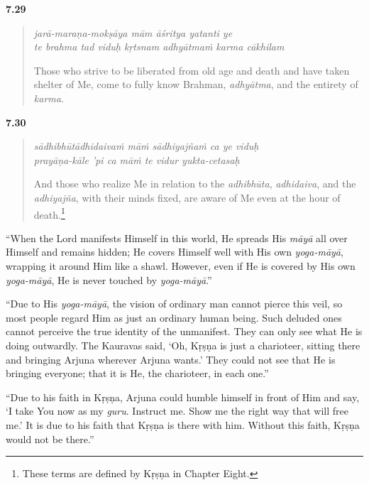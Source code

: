 \par\noindent\textbf{7.29}\par
\begin{verse}
\textit{jarā-maraṇa-mokṣāya mām āśritya yatanti ye} \\
\textit{te brahma tad viduḥ kṛtsnam adhyātmaṁ karma cākhilam}

\noindent Those who strive to be liberated from old age and death and have taken shelter of Me, come to fully know Brahman, \textit{adhyātma}, and the entirety of \textit{karma}.
\end{verse}
\par



\par\noindent\textbf{7.30}\par
\begin{verse}
\textit{sādhibhūtādhidaivaṁ māṁ sādhiyajñaṁ ca ye viduḥ} \\
\textit{prayāṇa-kāle ’pi ca māṁ te vidur yukta-cetasaḥ}

\noindent And those who realize Me in relation to the \textit{adhibhūta}, \textit{adhidaiva}, and the \textit{adhiyajña}, with their minds fixed, are aware of Me even at the hour of death.\footnote{These terms are defined by Kṛṣṇa in Chapter Eight.}
\end{verse}
\par


\enquote{When the Lord manifests Himself in this world, He spreads His \textit{māyā} all over Himself and remains hidden; He covers Himself well with His own \textit{yoga-māyā}, wrapping it around Him like a shawl. However, even if He is covered by His own \textit{yoga-māyā}, He is never touched by \textit{yoga-māyā}.}

\enquote{Due to His \textit{yoga-māyā}, the vision of ordinary man cannot pierce this veil, so most people regard Him as just an ordinary human being. Such deluded ones cannot perceive the true identity of the unmanifest. They can only see what He is doing outwardly. The Kauravas said, \enquote{Oh, Kṛṣṇa is just a charioteer, sitting there and bringing Arjuna wherever Arjuna wants.} They could not see that He is bringing everyone; that it is He, the charioteer, in each one.}

\enquote{Due to his faith in Kṛṣṇa, Arjuna could humble himself in front of Him and say, \enquote{I take You now as my \textit{guru}. Instruct me. Show me the right way that will free me.} It is due to his faith that Kṛṣṇa is there with him. Without this faith, Kṛṣṇa would not be there.}

